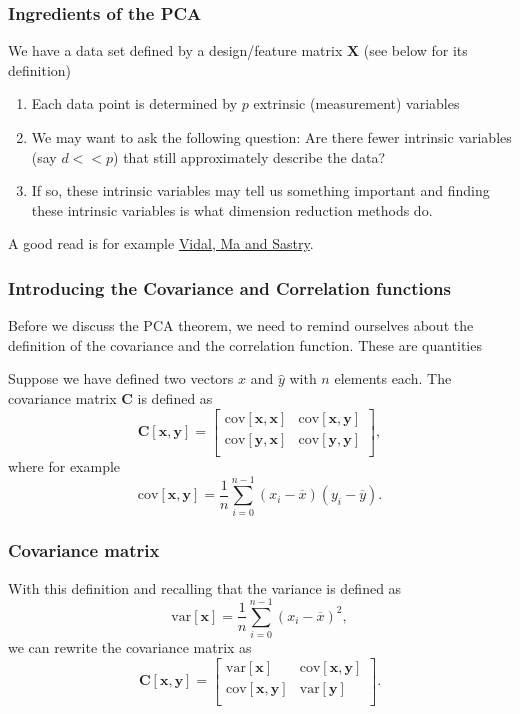 \documentclass{beamer}
\begin{document}
\begin{frame}
\frametitle{Ingredients of the PCA}

We have a data set defined by a design/feature matrix $\bm{X}$ (see below for its definition) 
\begin{enumerate}
\item Each data point is determined by $p$ extrinsic (measurement) variables

\item We may want to ask the following question: Are there fewer intrinsic variables (say $d << p$) that still approximately describe the data?

\item If so, these intrinsic variables may tell us something important and finding these intrinsic variables is what dimension reduction methods do. 
\end{enumerate}

\noindent
A good read is for example \href{{https://www.springer.com/gp/book/9780387878102}}{Vidal, Ma and Sastry}.
\end{frame}

\begin{frame}
\frametitle{Introducing the Covariance and Correlation functions}

Before we discuss the PCA theorem, we need to remind ourselves about
the definition of the covariance and the correlation function. These are quantities 

Suppose we have defined two vectors
$\hat{x}$ and $\hat{y}$ with $n$ elements each. The covariance matrix $\bm{C}$ is defined as 
\[
\bm{C}[\bm{x},\bm{y}] = \begin{bmatrix} \mathrm{cov}[\bm{x},\bm{x}] & \mathrm{cov}[\bm{x},\bm{y}] \\
                              \mathrm{cov}[\bm{y},\bm{x}] & \mathrm{cov}[\bm{y},\bm{y}] \\
             \end{bmatrix},
\]
where for example
\[
\mathrm{cov}[\bm{x},\bm{y}] =\frac{1}{n} \sum_{i=0}^{n-1}(x_i- \overline{x})(y_i- \overline{y}).
\]
\end{frame}

\begin{frame}
\frametitle{Covariance matrix}

With this definition and recalling that the variance is defined as
\[
\mathrm{var}[\bm{x}]=\frac{1}{n} \sum_{i=0}^{n-1}(x_i- \overline{x})^2,
\]
we can rewrite the covariance matrix as 
\[
\bm{C}[\bm{x},\bm{y}] = \begin{bmatrix} \mathrm{var}[\bm{x}] & \mathrm{cov}[\bm{x},\bm{y}] \\
                              \mathrm{cov}[\bm{x},\bm{y}] & \mathrm{var}[\bm{y}] \\
             \end{bmatrix}.
\]
\end{frame}
\end{document}
